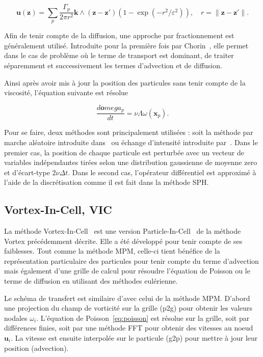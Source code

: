 \begin{equation*}
    \bm u(\bm z) = \sum_p \frac{\Gamma_p}{2\pi r^2} \bm k \wedge (\bm z - \bm z')(1 - \exp(-r^2 / \varepsilon^2)), \quad r = \|\bm z - \bm z'\|.
\end{equation*}

Afin de tenir compte de la diffusion, une approche par fractionnement est généralement utilisé. Introduite pour la première fois par Chorin~\cite{chorin_discretization_1973}, elle permet dans le cas de problème où le terme de transport est dominant, de traiter séparemment et successivement les termes d'advection et de diffusion.

Ainsi après avoir mis à jour la position des particules sans tenir compte de la viscosité, l'équation suivante est résolue

\begin{equation*}
    \frac{d\bm omega_p}{dt} = \nu \Lambda \omega(\bm x_p).
\end{equation*}

Pour se faire, deux méthodes sont principalement utilisées : soit la méthode par marche aléatoire introduite dans~\cite{chorin_discretization_1973} ou échange d'intensité introduite par~\cite{1989MaCom..53..485D}.
Dans le premier cas, la position de chaque particule est perturbée avec un vecteur de variables indépendantes tirées selon une distribution gaussienne de moyenne zero et d'écart-type $2\nu \Delta t$. Dans le second cas, l'opérateur différentiel est approximé à l'aide de la discrétisation comme il est fait dans la méthode SPH.

\subsection{Vortex-In-Cell, VIC}

La méthode Vortex-In-Cell~\cite{christiansen_1973} est une version Particle-In-Cell~\cite{birdsall_1969} de la méthode Vortex précédemment décrite. Elle a été développé pour tenir compte de ses faiblesses. Tout comme la méthode MPM, celle-ci tient bénéfice de la représentation particulaire des particules pour tenir compte du terme d'advection mais également d'une grille de calcul pour résoudre l'équation de Poisson ou le terme de diffusion en utilisant des méthodes eulérienne.

Le schéma de transfert est similaire d'avec celui de la méthode MPM. D'abord une projection du champ de vorticité sur la grille (p2g) pour obtenir les valeurs nodales $\omega_i$. L'équation de Poisson~\ref{eq:poisson} est résolue sur la grille, soit par différences finies, soit par une méthode FFT pour obtenir des vitesses au noeud $\bm u_i$. La vitesse est ensuite interpolée sur le particule (g2p) pour mettre à jour leur position (advection).

